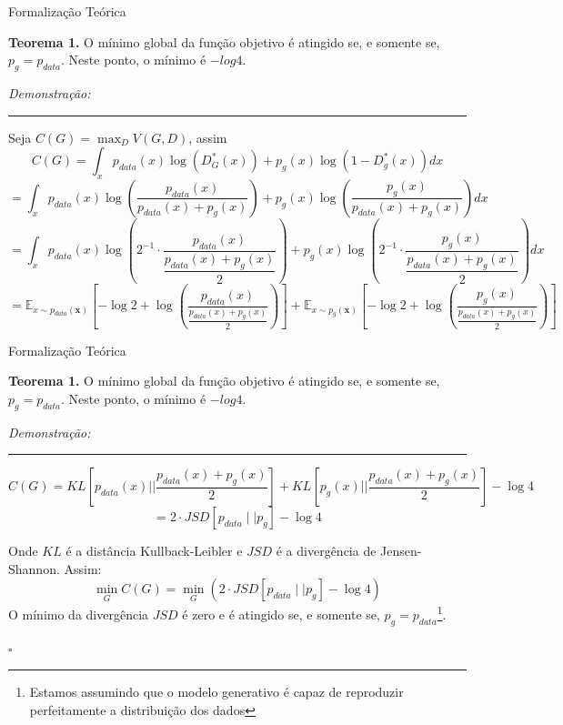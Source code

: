 \documentclass[10pt]{beamer}
\newcommand*{\QEDB}{\hfill\ensuremath{\square}}%
\begin{document}







\begin{frame}[fragile]{Formalização Teórica}

\small
	\textbf{Teorema 1.} O mínimo global da função objetivo
	é atingido se, e somente se, $p_g = p_{data}$. Neste ponto,
	o mínimo é $-log4$.

	\textit{Demonstração:}
	\hrule

  Seja $C(G) = \max_{D}V(G,D)$, assim
  $$C(G) = \int_{x}p_{data}(x)\log{\left(D_{G}^{*}(x)\right)}
  + p_{g}(x)\log{\left(1-D_{g}^{*}(x)\right)}dx $$
  \pause
  $$
  = \int_{x}p_{data}(x)\log{\left(\dfrac{p_{data}(x)}{p_{data}(x)
  + p_{g}(x)}\right)} + p_{g}(x)\log{\left(\dfrac{p_{g}(x)}{p_{data}(x)
  + p_{g}(x)}\right)}dx $$
  \pause
  $$= \int_{x}p_{data}(x)
  \log{\left(2^{-1}\cdot \dfrac{p_{data}(x)}{\dfrac{p_{data}(x)
  + p_{g}(x)}{2}}\right)} + p_{g}(x)
  \log{\left(2^{-1}\cdot \dfrac{p_{g}(x)}{\dfrac{p_{data}(x)
  + p_{g}(x)}{2}}\right)}dx	$$
  \pause
  \footnotesize
  $$=
    \mathbb{E}_{x\sim p_{data}(\bm x)}\left[-\log 2+
    \log \left(
    \frac{p_{data}(x)}{\frac{p_{data}(x)+p_g(x)}{2}}\right)
    \right]+
    \mathbb{E}_{x\sim p_g(\bm x)}\left[-\log2+
    \log \left(\frac{p_{g}(x)}{\frac{p_{data}(x)+p_g(x)}{2}}\right)
    \right]
  $$

\end{frame}

\begin{frame}[fragile]{Formalização Teórica}

\small
	\textbf{Teorema 1.} O mínimo global da função objetivo
	é atingido se, e somente se, $p_g = p_{data}$. Neste ponto,
	o mínimo é $-log4$.

	\textit{Demonstração:}
	\hrule
  $$C(G) = KL\left[p_{data}(x)||\dfrac{p_{data}(x)+p_g(x)}{2}\right] + KL\left[p_g(x)||\dfrac{p_{data}(x) + p_g(x)}{2}\right] - \log{4} $$
  $$= 2 \cdot JSD\left[ p_{data} \mid \mid p_g
  \right] - \log 4$$

  Onde $KL$ é a distância Kullback-Leibler e $JSD$ é a divergência
  de Jensen-Shannon. Assim:
  $$\min_G C(G) = \min_G \left( 2 \cdot JSD\left[ p_{data} \mid \mid p_g
  \right] - \log 4 \right)$$
  O mínimo da divergência $JSD$ é zero e é atingido se, e somente se,
  $p_g = p_{data}$\footnote{Estamos assumindo que o modelo
  generativo é capaz de reproduzir perfeitamente a distribuição dos
  dados}.

  \QEDB
\end{frame}
\end{document}
